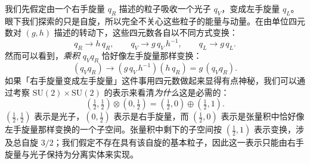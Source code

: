 我们先假定由一个右手旋量 $q_R$ 描述的粒子吸收一个光子 $q_V$，变成左手旋量 $q_L$。眼下我们探索的只是自旋，所以完全不关心这些粒子的能量与动量。在由单位四元数对 $(g,h)$ 描述的转动下，这些四元数各自以不同方式变换：
\begin{equation*}
q_R\to h\,q_R,\qquad q_V\to g\,q_V\,h^{-1},\qquad q_L\to g\,q_L .
\end{equation*}
然而可以看到，\emph{乘积} $q_V q_R$ 恰好像左手旋量那样变换：
\begin{equation*}
(q_V q_R)\to(g\,q_V\,h^{-1})(h\,q_R)=g\,(q_V q_R).
\end{equation*}
如果「右手旋量变成左手旋量」这件事用四元数做起来显得有点神秘，我们可以通过考察 $\mathrm{SU}(2)\times\mathrm{SU}(2)$ 的表示来看清\emph{为什么}这是必需的：
\begin{equation*}
(\tfrac12,\tfrac12)\otimes(0,\tfrac12)=(\tfrac12,0)\oplus(\tfrac12,1).
\end{equation*}
$(\tfrac12,\tfrac12)$ 表示是光子，$(0,\tfrac12)$ 表示是右手旋量，而 $(\tfrac12,0)$ 表示是张量积中恰好像左手旋量那样变换的一个子空间。张量积中剩下的子空间按 $(\tfrac12,1)$ 表示变换，涉及总自旋 $3/2$；我们假定不存在具有该自旋的基本粒子，因此这一表示只能由右手旋量与光子保持为分离实体来实现。

